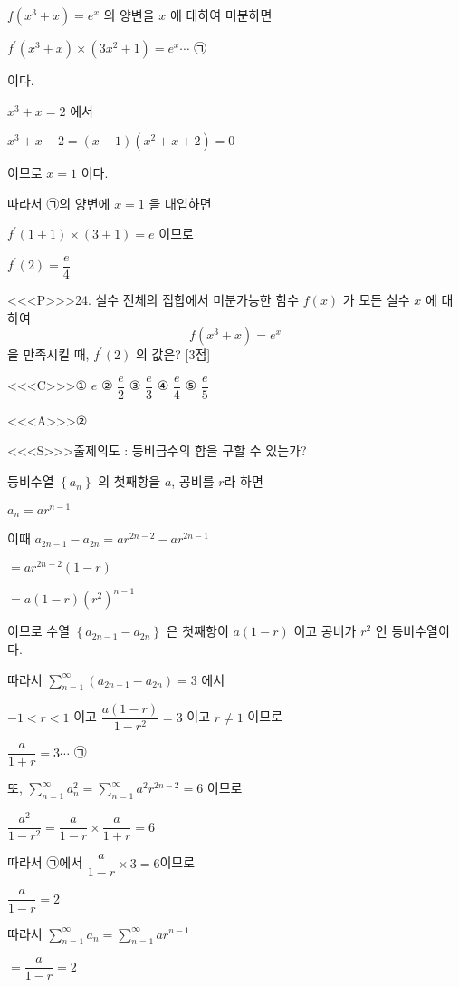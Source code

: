 \documentclass{oblivoir}
\begin{document}
$f\left(x^{3}+x\right)=e^{x}$ 의 양변을 $x$ 에 대하여 미분하면

$f^{\prime}\left(x^{3}+x\right) \times\left(3 x^{2}+1\right)=e^{x} \cdots$ ㉠

이다.

$x^{3}+x=2$ 에서

$x^{3}+x-2=(x-1)\left(x^{2}+x+2\right)=0$

이므로 $x=1$ 이다.

따라서 ㉠의 양변에 $x=1$ 을 대입하면

$f^{\prime}(1+1) \times(3+1)=e$
이므로

$f^{\prime}(2)=\dfrac{e}{4}$


<<<P>>>24. 실수 전체의 집합에서 미분가능한 함수 $f(x)$ 가 모든 실수 $x$ 에 대하여
$$
f\left(x^{3}+x\right)=e^{x}
$$
을 만족시킬 때, $f^{\prime}(2)$ 의 값은? [3점]

<<<C>>>① $e$
② $\dfrac{e}{2}$
③ $\dfrac{e}{3}$
④ $\dfrac{e}{4}$
⑤ $\dfrac{e}{5}$


<<<A>>>②

<<<S>>>출제의도 : 등비급수의 합을 구할 수 있는가?

등비수열 $\left\{a_{n}\right\}$ 의 첫째항을 $a$, 공비를 $r$라 하면

$a_{n}=a r^{n-1}$

이때
$a_{2 n-1}-a_{2 n}=a r^{2 n-2}-a r^{2 n-1}$

$=a r^{2 n-2}(1-r)$

$=a(1-r)\left(r^{2}\right)^{n-1}$

이므로 수열 $\left\{a_{2 n-1}-a_{2 n}\right\}$ 은 첫째항이
$a(1-r)$ 이고 공비가 $r^{2}$ 인 등비수열이다.

따라서 $\displaystyle\sum_{n=1}^{\infty}\left(a_{2 n-1}-a_{2 n}\right)=3$ 에서

$-1<  r<  1$ 이고 $\dfrac{a(1-r)}{1-r^{2}}=3$ 이고 $r \neq 1$ 이므로

$\dfrac{a}{1+r}=3 \cdots$ ㉠

또, $\displaystyle\sum_{n=1}^{\infty} a_{n}^{2}=\displaystyle\sum_{n=1}^{\infty} a^{2} r^{2 n-2}=6$ 이므로

$\dfrac{a^{2}}{1-r^{2}}=\dfrac{a}{1-r} \times \dfrac{a}{1+r}=6$

따라서 ㉠에서 $\dfrac{a}{1-r} \times 3=6$이므로

$\dfrac{a}{1-r}=2$

따라서
$\displaystyle\sum_{n=1}^{\infty} a_{n}=\displaystyle\sum_{n=1}^{\infty} a r^{n-1}$

$=\dfrac{a}{1-r}=2$
\end{document}

